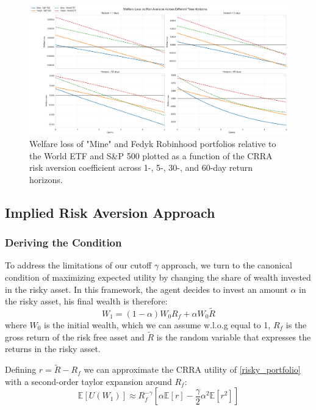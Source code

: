 \begin{figure}[H]
    \centering
    \includegraphics[width=\linewidth]{../images/wl_mkt.png}
\caption{Welfare loss of "Mine" and Fedyk Robinhood portfolios relative to the World ETF and S\&P 500 plotted as a function of the CRRA risk aversion coefficient across 1-, 5-, 30-, and 60-day return horizons.}
\label{fig:wl_mkt}
\end{figure}    



\subsection{Implied Risk Aversion Approach}
\subsubsection{Deriving the Condition}
To address the limitations of our cutoff $\gamma$ approach, we turn to the canonical condition of maximizing expected utility by changing the share of wealth invested in the risky asset.  
In this framework, the agent decides to invest an amount $\alpha$ in the risky asset, his final wealth is therefore:
\begin{equation}
    W_1 = (1-\alpha) W_0 R_f  + \alpha W_0 \tilde R 
    \label{risky_portfolio}
\end{equation}
where $W_0$ is the initial wealth, which we can assume w.l.o.g equal to 1, $R_f$ is the gross return of the risk free asset and $\tilde R$ is the random variable that expresses the returns in the risky asset.

Defining $r=\tilde R - R_f$ we can approximate the CRRA utility of \ref{risky_portfolio} with a second-order taylor expansion around $R_f$:
\begin{equation}
    \mathbb{E}[U(W_1)] \approx R_f^{-\gamma} [\alpha \mathbb{E}[r] - \frac{\gamma}{2}\alpha^2\mathbb{E}[r^2]]
\end{equation} 

